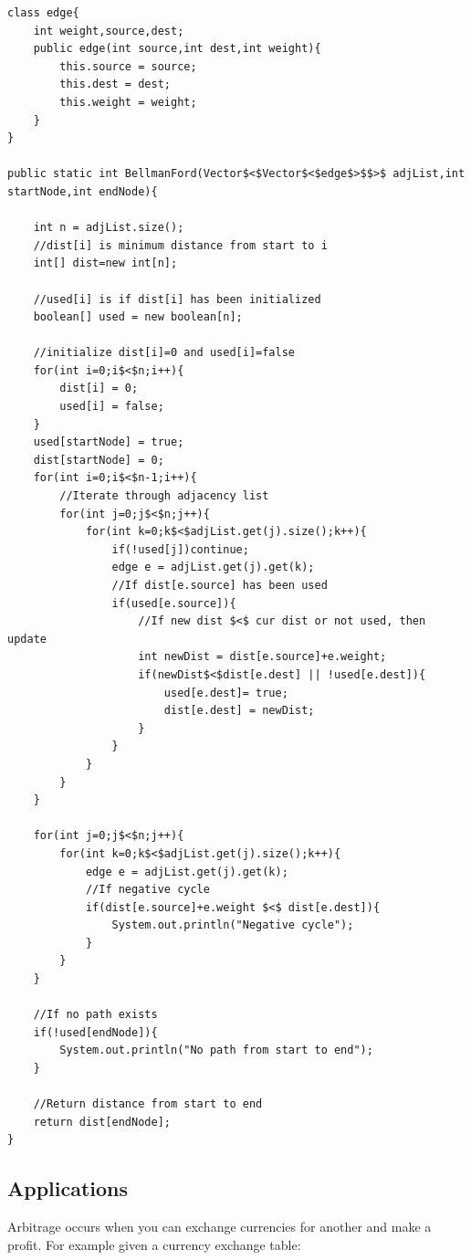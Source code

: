 \documentclass[11pt,oneside]{book}
\begin{document}
\begin{lstlisting}
class edge{
    int weight,source,dest;
    public edge(int source,int dest,int weight){
        this.source = source;
        this.dest = dest;
        this.weight = weight;
    }
}

public static int BellmanFord(Vector$<$Vector$<$edge$>$$>$ adjList,int startNode,int endNode){
    
    int n = adjList.size();
    //dist[i] is minimum distance from start to i
    int[] dist=new int[n];
    
    //used[i] is if dist[i] has been initialized
    boolean[] used = new boolean[n];
    
    //initialize dist[i]=0 and used[i]=false
    for(int i=0;i$<$n;i++){
        dist[i] = 0;
        used[i] = false;
    }
    used[startNode] = true;
    dist[startNode] = 0;
    for(int i=0;i$<$n-1;i++){
        //Iterate through adjacency list
        for(int j=0;j$<$n;j++){
            for(int k=0;k$<$adjList.get(j).size();k++){
                if(!used[j])continue;
                edge e = adjList.get(j).get(k);
                //If dist[e.source] has been used
                if(used[e.source]){
                    //If new dist $<$ cur dist or not used, then update
                    int newDist = dist[e.source]+e.weight;
                    if(newDist$<$dist[e.dest] || !used[e.dest]){
                        used[e.dest]= true; 
                        dist[e.dest] = newDist;
                    }
                }
            }
        }
    }
    
    for(int j=0;j$<$n;j++){
        for(int k=0;k$<$adjList.get(j).size();k++){
            edge e = adjList.get(j).get(k);
            //If negative cycle
            if(dist[e.source]+e.weight $<$ dist[e.dest]){
                System.out.println("Negative cycle");
            }
        }
    }
    
    //If no path exists
    if(!used[endNode]){
        System.out.println("No path from start to end");
    }
    
    //Return distance from start to end
    return dist[endNode];
}

\end{lstlisting}

\subsection{Applications}

Arbitrage occurs when you can exchange currencies for another and make a profit. For example given a currency exchange table:
\end{document}
